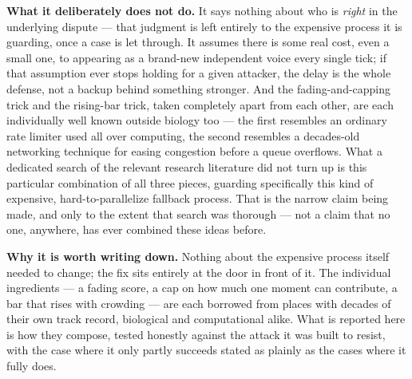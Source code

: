 \documentclass[11pt]{article}
\begin{document}
\textbf{What it deliberately does not do.} It says nothing about who is
\emph{right} in the underlying dispute --- that judgment is left entirely
to the expensive process it is guarding, once a case is let through. It
assumes there is some real cost, even a small one, to appearing as a
brand-new independent voice every single tick; if that assumption ever
stops holding for a given attacker, the delay is the whole defense, not
a backup behind something stronger. And the fading-and-capping trick and
the rising-bar trick, taken completely apart from each other, are each
individually well known outside biology too --- the first resembles an
ordinary rate limiter used all over computing, the second resembles a
decades-old networking technique for easing congestion before a queue
overflows. What a dedicated search of the relevant research literature
did not turn up is this particular combination of all three pieces,
guarding specifically this kind of expensive, hard-to-parallelize
fallback process. That is the narrow claim being made, and only to the
extent that search was thorough --- not a claim that no one, anywhere,
has ever combined these ideas before.

\textbf{Why it is worth writing down.} Nothing about the expensive
process itself needed to change; the fix sits entirely at the door in
front of it. The individual ingredients --- a fading score, a cap on
how much one moment can contribute, a bar that rises with crowding ---
are each borrowed from places with decades of their own track record,
biological and computational alike. What is reported here is how they
compose, tested honestly against the attack it was built to resist, with
the case where it only partly succeeds stated as plainly as the cases
where it fully does.
\end{document}
